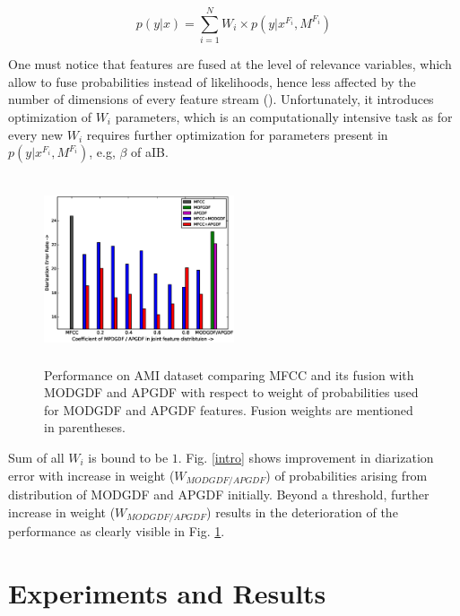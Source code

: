 \documentclass[conference]{IEEEtran}
\begin{document}
\begin{equation}
p(y|x) = \sum _{i=1}^{N} W_i \times p(y|x^{F_{i}},M^{F_{i}})
\label{eq:feat_combs}
\end{equation}

One must notice that features are fused at the level of relevance variables,
which allow to fuse probabilities instead of likelihoods, hence less affected by
the number of dimensions of every feature stream (\cite{aIB}). Unfortunately, it
introduces optimization of $W_i$ parameters, which is an computationally
intensive task as for every new $W_i$ requires further optimization for
parameters present in $p(y|x^{F_{i}},M^{F_{i}})$, e.g, $\beta$ of aIB.

\begin{figure}[h]
\centering
\includegraphics[width=0.5\textwidth,height=5.5cm]{figures/newFusionResults.eps}
\caption{Performance on AMI dataset comparing MFCC and its fusion with MODGDF
and APGDF with respect to weight of probabilities used for MODGDF and APGDF
features. Fusion weights are mentioned in parentheses.}
\label{fig:fusionResults}
\end{figure}
Sum of all $W_i$ is bound to be $1$. Fig. \ref{intro} shows improvement in
diarization error with increase in weight ($W_{MODGDF/APGDF}$) of probabilities
arising from distribution of MODGDF and APGDF initially. Beyond a threshold,
further increase in weight ($W_{MODGDF/APGDF}$) results in the deterioration of
the performance as clearly visible in Fig. \ref{fig:fusionResults}.   

\section{Experiments and Results}
\label{experimentsNresults}
\end{document}
